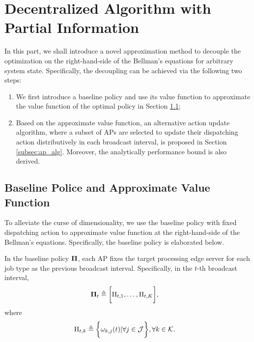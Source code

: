 \section{Decentralized Algorithm with Partial Information}
\label{sec:algorithm}

In this part, we shall introduce a novel approximation method to decouple the optimization on the right-hand-side of the Bellman's equations for arbitrary system state.
Specifically, the decoupling can be achieved via the following two steps:
\begin{enumerate}
    \item We first introduce a baseline policy and use its value function to approximate the value function of the optimal policy in Section \ref{subsec:baseline};
    \item Based on the approximate value function, an alternative action update algorithm, where a subset of APs are selected to update their dispatching action distributively in each broadcast interval, is proposed in Section \ref{subsec:ap_alg}.
    Moreover, the analytically performance bound is also derived.
\end{enumerate}

\subsection{Baseline Police and Approximate Value Function}
\label{subsec:baseline}
To alleviate the curse of dimensionality, we use the baseline policy with fixed dispatching action to approximate value function at the right-hand-side of the Bellman's equations.
Specifically, the baseline policy is elaborated below.

\begin{policy}
    In the baseline policy $\boldsymbol{\Pi}$, each AP fixes the target processing edge server for each job type as the previous broadcast interval. Specifically, in the $t$-th broadcast interval,
    \begin{align}
        \boldsymbol{\Pi}_{t} &\triangleq \bigg[ \Pi_{t,1}, \dots, \Pi_{t,K} \bigg],
    \end{align}
    where 
    \begin{align}
        \Pi_{t,k} &\triangleq \bigg\{
            \omega_{k,j}(t) | \forall j\in\mathcal{J}
        \bigg\}, \forall k\in\mathcal{K}.
    \end{align}
\end{policy}


